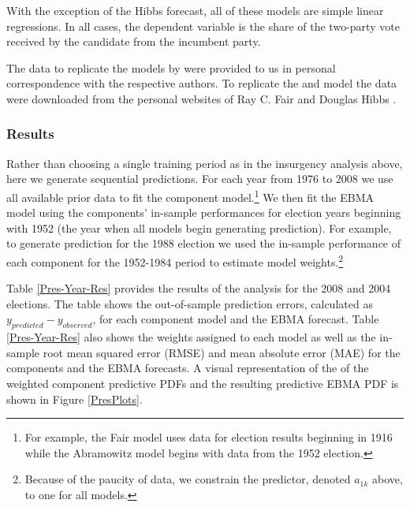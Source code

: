\documentclass[pdftex,12pt,fullpage,oneside]{amsart}
\begin{document}
\noindent With the exception of the Hibbs forecast, all of these models are
simple linear regressions.  In all cases, the dependent variable
is the share of the two-party vote received by the candidate from the
incumbent party.  

The data to replicate the models by \citet{Abramowitz:2008,Campbell:2008,Erikson:Wlezien:2008,Lewis-Beck:Tien:2008} were provided to us in personal correspondence with the respective authors. To replicate the \citet{Hibbs:2000} and \citet{Fair:2010} model the data were downloaded from the personal websites of Ray C. Fair \citep{Fair2011} and Douglas Hibbs \citet{Hibbs2011}. 

\subsubsection{Results}

Rather than choosing a single training period as in the insurgency
analysis above, here we generate sequential predictions.  For each
year from 1976 to 2008 we use all available prior data to fit the
component model.\footnote{For example, the Fair model uses data for election
  results beginning in 1916 while the Abramowitz model begins with
  data from the 1952 election. }  We then fit the EBMA model using the
components' in-sample performances for election years beginning with
1952 (the year when all models begin generating prediction).  For
example, to generate prediction for the 1988 election we used the
in-sample performance of each component for the 1952-1984 period to
estimate model weights.\footnote{Because of the paucity of data, we
  constrain the predictor, denoted $a_{1k}$ above, to one for all
  models.}

Table \ref{Pres-Year-Res} provides the results of the analysis for the
2008 and 2004 elections.  The table shows the out-of-sample prediction
errors, calculated as $y_{predicted}-y_{observed}$, for each component
model and the EBMA forecast.  Table \ref{Pres-Year-Res} also shows the
weights assigned to each model as well as the in-sample root mean
squared error (RMSE) and mean absolute error (MAE) for the
components and the EBMA forecasts.  A visual representation of the of
the weighted component predictive PDFs and the resulting predictive EBMA PDF is
shown in Figure \ref{PresPlots}.
\end{document}
